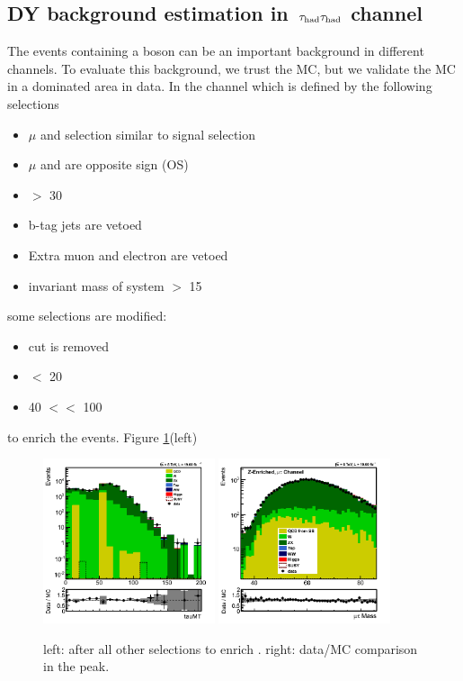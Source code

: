 \subsection{\texorpdfstring{DY background estimation in $\,\tau_{\rm had}\tau_{\rm had}$ channel}{DY background estimation in tau-tau channel}}
The events containing a \Z boson can be an important background in different channels. To evaluate this background, we trust 
the MC, but we validate the MC in a \Z dominated area in data. In the \muTau channel which is defined by the following selections 
\begin{itemize}
\item $\mu$ and \Tau selection similar to signal selection
\item $\mu$ and \Tau are opposite sign (OS)
\item \MET $>$ 30 
\item b-tag jets are vetoed
\item Extra muon and electron are vetoed 
\item invariant mass of \muTau system $>$ 15 \GeV
\end{itemize}
some selections are modified:
\begin{itemize}
\item \mindphifour cut is removed
\item \mttwo $<$ 20 \GeV
\item 40 $<$\tauMT $<$ 100 \GeV
\end{itemize}
to enrich the \Z events. Figure \ref{fig:ZValidation}(left)
\begin{figure}[h]
\centering
\includegraphics[width=0.45\textwidth,keepaspectratio=true]{ZValidation/tauMT_ZValidation.png}
\includegraphics[width=0.45\textwidth,keepaspectratio=true]{ZValidation/InvMass_ZValidation.png}
\caption{left: \tauMT after all other selections to enrich \Z. right: data/MC comparison in the \Z peak.}
\label{fig:ZValidation}
\end{figure}
